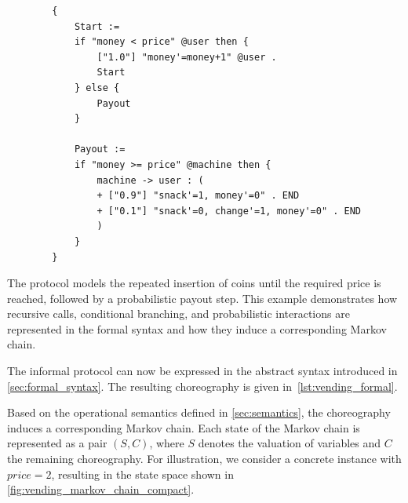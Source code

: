 \begin{listing}[ht]
	\begin{verbatim}
		{
			Start :=
			if "money < price" @user then {
				["1.0"] "money'=money+1" @user .
				Start
			} else {
				Payout
			}
			
			Payout :=
			if "money >= price" @machine then {
				machine -> user : (
				+ ["0.9"] "snack'=1, money'=0" . END
				+ ["0.1"] "snack'=0, change'=1, money'=0" . END
				)
			}
		}
	\end{verbatim}
	\caption{A running example: \texttt{VendingMachine}}
	\label{lst:vending_formal}	
\end{listing}


The protocol models the repeated insertion of coins until the required price is reached, followed by a probabilistic payout step. This example demonstrates how recursive calls, conditional branching, and probabilistic interactions are represented in the formal syntax and how they induce a corresponding Markov chain.

The informal protocol can now be expressed in the abstract syntax introduced in \cref{sec:formal_syntax}. The resulting choreography is given in~\cref{lst:vending_formal}. 


Based on the operational semantics defined in \cref{sec:semantics}, the choreography induces a corresponding Markov chain. Each state of the Markov chain is represented as a pair $(S, C)$, where $S$ denotes the valuation of variables and $C$ the remaining choreography.
For illustration, we consider a concrete instance with $price = 2$, resulting in the state space shown in \cref{fig:vending_markov_chain_compact}.

